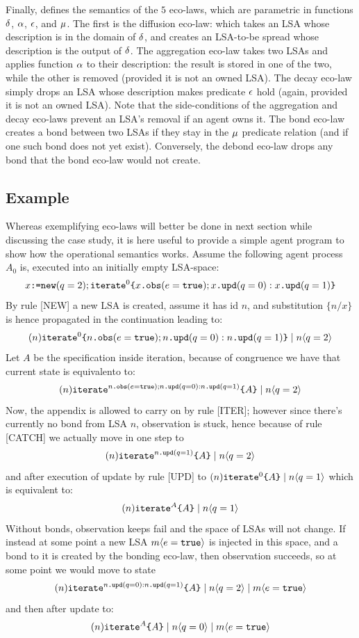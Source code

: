 \documentclass[12pt,a4paper,twoside,openright]{book}
\begin{document}
Finally,  defines the semantics of the $5$ eco-laws, which are parametric in functions $\fDiff$, $\fAggr$, $\fDecay$, and $\fBond$.
%
The first is the diffusion eco-law: which takes an LSA whose description is in the domain of $\fDiff$, and creates an LSA-to-be spread whose description is the output of $\fDiff$.
%
The aggregation eco-law takes two LSAs and applies function $\fAggr$ to their description: the result is stored in one of the two, while the other is removed (provided it is not an owned LSA).
%
The decay eco-law simply drops an LSA whose description makes predicate $\fDecay$ hold (again, provided it is not an owned LSA).
%
Note that the side-conditions of the aggregation and decay eco-laws prevent an LSA's removal if an agent owns it.
%
The bond eco-law creates a bond between two LSAs if they stay in the $\fBond$ predicate relation (and if one such bond does not yet exist).
%
Conversely, the debond eco-law drops any bond that the bond eco-law would not create.

\subsection{Example}

Whereas exemplifying eco-laws will better be done in next section while discussing the case study, it is here useful to provide a simple agent program to show how the operational semantics works.
%
Assume the following agent process $A_0$ is, executed into an initially empty LSA-space:
%
\[\cNew{x}{q=2};\cRecR{\cObs{x}{e=\texttt{true}};\cUpd{x}{q=0}:\cUpd{x}{q=1}}{0}\]
%
By rule [NEW] a new LSA is created, assume it has id $n$, and substitution $\{n/x\}$ is hence propagated in the continuation leading to:
%
\[(n)\cRecR{\cObs{n}{e=\texttt{true}};\cUpd{n}{q=0}:\cUpd{n}{q=1}}{0}\oCPar\cLSA{n}{q=2}\]
%
Let $A$ be the specification inside iteration, because of congruence we have that current state is equivalento to:
%
\[(n)\cRecR{A}{\cObs{n}{e=\texttt{true}};\cUpd{n}{q=0}:\cUpd{n}{q=1}}\oCPar\cLSA{n}{q=2}\]
%
Now, the appendix is allowed to carry on by rule [ITER]; however since there's currently no bond from LSA $n$, observation is stuck, hence because of rule [CATCH] we actually move in one step to
%
\[(n)\cRecR{A}{\cUpd{n}{q=1}}\oCPar\cLSA{n}{q=2}\]
%
and after execution of update by rule [UPD] to \mbox{$(n)\cRecR{A}{0}\oCPar\cLSA{n}{q=1}$} which is equivalent to:
%
\[(n)\cRecR{A}{A}\oCPar\cLSA{n}{q=1}\]
%
Without bonds, observation keeps fail and the space of LSAs will not change.
%
If instead at some point a new LSA $\cLSA{m}{e=\texttt{true}}$ is injected in this space, and a bond to it is created by the bonding eco-law, then observation succeeds, so at some point we would move to state
%
\[(n)\cRecR{A}{\cUpd{n}{q=0}:\cUpd{n}{q=1}}\oCPar\cLSA{n}{q=2}\oCPar\cLSA{m}{e=\texttt{true}}\]
%
and then after update to:
%
\[(n)\cRecR{A}{A}\oCPar\cLSA{n}{q=0}\oCPar\cLSA{m}{e=\texttt{true}}\]
\end{document}
